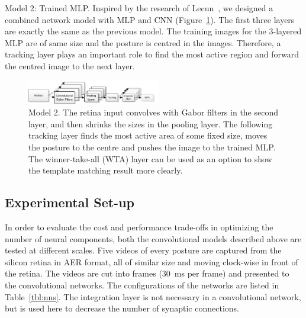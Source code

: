 \documentclass[journal]{journal}
\begin{document}
Model 2: Trained MLP. 
Inspired by the research of Lecun~\cite{lecun1998gradient}, we designed a combined network model with MLP and CNN (Figure~\ref{fig:model2}). 
The first three layers are exactly the same as the previous model.
The training images for the 3-layered MLP are of same size and the posture is centred in the images.
Therefore, a tracking layer plays an important role to find the most active region and forward the centred image to the next layer.

\begin{figure}
\centering
	\includegraphics[width=0.52\textwidth]{pics/model2.pdf}
	\caption{Model 2. 
	The retina input convolves with Gabor filters in the second layer, and then shrinks the sizes in the pooling layer.
	The following tracking layer finds the most active area of some fixed size, moves the posture to the centre and pushes the image to the trained MLP.
	The winner-take-all (WTA) layer can be used as an option to show the template matching result more clearly.}
	\label{fig:model2}
\end{figure}


\subsection{Experimental Set-up}
\label{sec:tat}
In order to evaluate the cost and performance trade-offs in optimizing the number of neural components, both the convolutional models described above are tested at different scales. 
Five videos of every posture are captured from the silicon retina in AER format, all of similar size and moving clock-wise in front of the retina. 
The videos are cut into frames (30~ms per frame) and presented to the convolutional networks. 
The configurations of the networks are listed in Table~\ref{tbl:nns}.
The integration layer is not necessary in a convolutional network, but is used here to decrease the number of synaptic connections.
\end{document}
